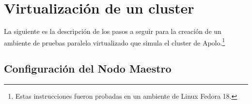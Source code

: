 \section{Virtualización de un cluster}




La siguiente es la descripción de los pasos a seguir para la creación de un ambiente de pruebas paralelo virtualizado que simula el cluster de Apolo.\footnote{Estas instrucciones fueron probadas en un ambiente de Linux Fedora 18.}


\subsection{Configuración del Nodo Maestro}
